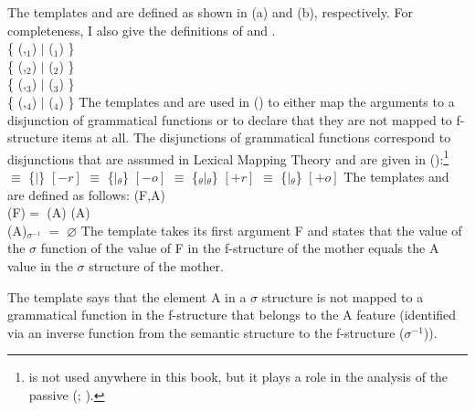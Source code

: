 The templates  and  are defined as shown in (a) and
(b), respectively. For completeness, I also give the definitions of  and .
\eal
\ex {} \tempeq\\
      \{ (,$_1$) $\mid$
      ($_1$) \}
\ex {} \tempeq\\
      \{ (,$_2$) $\mid$
      ($_2$) \}
\ex {} \tempeq\\
      \{ (,$_3$) $\mid$
      ($_3$) \}
\ex {} \tempeq\\
      \{ (,$_4$) $\mid$
      ($_4$) \}
\zl
The templates  and  are used in () to either map the arguments to a
disjunction of grammatical functions or to declare that they are not mapped to f-structure items at
all. The disjunctions of grammatical functions correspond to disjunctions that are assumed in
Lexical Mapping Theory and are given in ():\footnote{%
   is not used anywhere in this book, but it plays a role in the analysis of the passive
  (\citealp[]{Findlay2016a-u}; \citealp[]{AGT2014a}).%
}
\eal
\ex {} $\equiv$
      \{$\mid$\}
      \hfill $[-r]$
\ex {} $\equiv$
      \{$\mid$$_\theta$\}
      \hfill $[-o]$
\ex {} $\equiv$
      \{$_\theta$$\mid$$_\theta$\}
      \hfill $[+r]$
\ex {} $\equiv$ 
      \{$\mid$$_\theta$\}
      \hfill $[+o]$
\zl
The templates  and  are defined as follows:
\eal
\ex {}(F,A) \tempeq\\  (\up F)\sig $=$  (\upsig A) 
\ex {}(A) \tempeq\\  (\upsig A)$_{{\sigma}^{-1}}$ $=$ $\varnothing$  
\zl
The template  takes its first argument F and states that the value of the $\sigma$
function of the value of F in the f-structure of the mother equals the A value in the $\sigma$ structure
of the mother.

The template  says that the element A in a $\sigma$ structure is not mapped to a
grammatical function in the f-structure that belongs to the A feature (identified via an inverse
function from the semantic structure to the f-structure ($\sigma^{-1}$)). 


